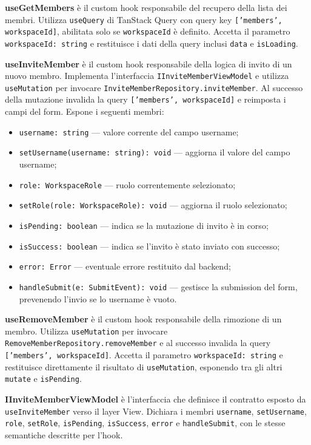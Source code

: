 \documentclass[a4paper, 11pt]{article}
\begin{document}
\textbf{useGetMembers} è il custom hook responsabile del recupero della lista dei membri.
Utilizza \texttt{useQuery} di TanStack Query con query key \texttt{['members', workspaceId]},
abilitata solo se \texttt{workspaceId} è definito. Accetta il parametro
\texttt{workspaceId: string} e restituisce i dati della query inclusi \texttt{data} e
\texttt{isLoading}.

\textbf{useInviteMember} è il custom hook responsabile della logica di invito di un nuovo membro.
Implementa l'interfaccia \texttt{IInviteMemberViewModel} e utilizza \texttt{useMutation} per
invocare \texttt{InviteMemberRepository.inviteMember}. Al successo della mutazione invalida la
query \texttt{['members', workspaceId]} e reimposta i campi del form. Espone i seguenti membri:
\begin{itemize}
  \item \texttt{username: string} — valore corrente del campo username;
  \item \texttt{setUsername(username: string): void} — aggiorna il valore del campo username;
  \item \texttt{role: WorkspaceRole} — ruolo correntemente selezionato;
  \item \texttt{setRole(role: WorkspaceRole): void} — aggiorna il ruolo selezionato;
  \item \texttt{isPending: boolean} — indica se la mutazione di invito è in corso;
  \item \texttt{isSuccess: boolean} — indica se l'invito è stato inviato con successo;
  \item \texttt{error: Error} — eventuale errore restituito dal backend;
  \item \texttt{handleSubmit(e: SubmitEvent): void} — gestisce la submission del form,
        prevenendo l'invio se lo username è vuoto.
\end{itemize}

\textbf{useRemoveMember} è il custom hook responsabile della rimozione di un membro. Utilizza
\texttt{useMutation} per invocare \texttt{RemoveMemberRepository.removeMember} e al successo
invalida la query \texttt{['members', workspaceId]}. Accetta il parametro
\texttt{workspaceId: string} e restituisce direttamente il risultato di \texttt{useMutation},
esponendo tra gli altri \texttt{mutate} e \texttt{isPending}.

\textbf{IInviteMemberViewModel} è l'interfaccia che definisce il contratto esposto da
\texttt{useInviteMember} verso il layer View. Dichiara i membri \texttt{username},
\texttt{setUsername}, \texttt{role}, \texttt{setRole}, \texttt{isPending}, \texttt{isSuccess},
\texttt{error} e \texttt{handleSubmit}, con le stesse semantiche descritte per l'hook.
\end{document}
